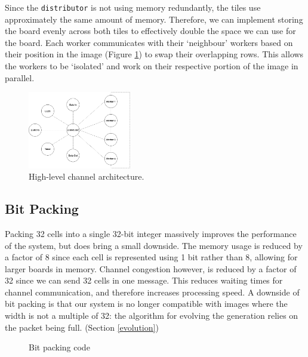 \documentclass{article}
\begin{document}
    Since the \verb|distributor| is not using memory redundantly, the tiles use approximately the same amount of memory. Therefore, we can implement storing the board evenly across both tiles to effectively double the space we can use for the board. Each worker communicates with their `neighbour' workers based on their position in the image (Figure \ref{fig:architecture}) to swap their overlapping rows. This allows the workers to be `isolated' and work on their respective portion of the image in parallel.
    
    \begin{figure}[h]
        \begin{center}
            \includegraphics[width=0.4\textwidth]{architecture.png}
            \caption{High-level channel architecture.}
            \label{fig:architecture}
        \end{center}
    \end{figure}


    \subsection{Bit Packing}

    Packing 32 cells into a single 32-bit integer massively improves the performance of the system, but does bring a small downside. The memory usage is reduced by a factor of 8 since each cell is represented using 1 bit rather than 8, allowing for larger boards in memory. Channel congestion however, is reduced by a factor of 32 since we can send 32 cells in one message. This reduces waiting times for channel communication, and therefore increases processing speed. A downside of bit packing is that our system is no longer compatible with images where the width is not a multiple of 32: the algorithm for evolving the generation relies on the packet being full. (Section \ref{evolution})
    
    \begin{figure}[h]
        
        \caption{Bit packing code}
        \label{fig:bitpack}
    \end{figure}
\end{document}
